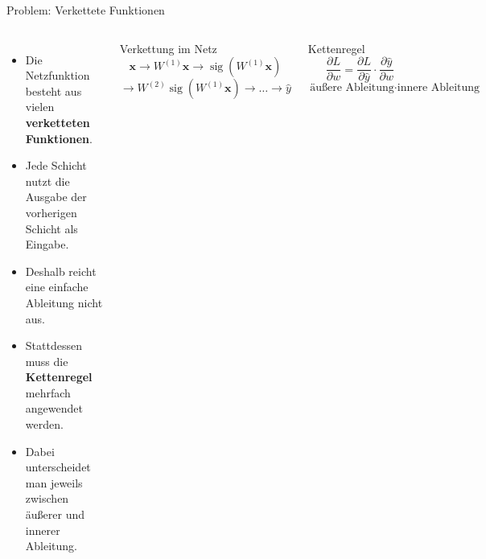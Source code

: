 \begin{frame}{Problem: Verkettete Funktionen}

\begin{columns}

\begin{itemize}
    \item Die Netzfunktion besteht aus vielen \textbf{verketteten Funktionen}.

    \item Jede Schicht nutzt die Ausgabe der vorherigen Schicht als Eingabe.

    \item Deshalb reicht eine einfache Ableitung nicht aus.

    \item Stattdessen muss die \textbf{Kettenregel} mehrfach angewendet werden.

    \item Dabei unterscheidet man jeweils zwischen äußerer und innerer
          Ableitung.
\end{itemize}


\begin{blockC1}{Verkettung im Netz}
\[
\mathbf{x}
\rightarrow
W^{(1)}\mathbf{x}
\rightarrow
\operatorname{sig}(W^{(1)}\mathbf{x})
\]
\[
\rightarrow W^{(2)}\operatorname{sig}(W^{(1)}\mathbf{x})
\rightarrow
\dots
\rightarrow
\hat{y}
\]
\end{blockC1}

\vspace{0.3cm}

\begin{blockC1}{Kettenregel}
\[
    \frac{\partial L}{\partial w}
    =
    \frac{\partial L}{\partial \hat{y}}
    \cdot
    \frac{\partial \hat{y}}{\partial w}
\]
\[
\text{äußere Ableitung}
\cdot
\text{innere Ableitung}
\]
\end{blockC1}

\end{columns}

\end{frame}

